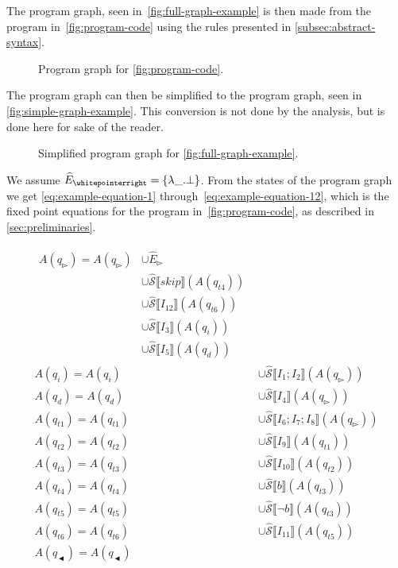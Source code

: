 The program graph, seen in~\autoref{fig:full-graph-example} is then made from the program in~\autoref{fig:program-code} using the rules presented in \autoref{subsec:abstract-syntax}.

\begin{figure}
    \centering
    
    \caption{Program graph for \autoref{fig:program-code}.}
    \label{fig:full-graph-example}
\end{figure}


The program graph can then be simplified to the program graph, seen in \autoref{fig:simple-graph-example}.
This conversion is not done by the analysis, but is done here for sake of the reader.

\begin{figure}
    \centering
    
    \caption{Simplified program graph for \autoref{fig:full-graph-example}.}
    \label{fig:simple-graph-example}
\end{figure}

We assume $\ab E_\whitepointerright=\{\lambda \_ .\bot\}$.
From the states of the program graph we get \autoref{eq:example-equation-1} through~\autoref{eq:example-equation-12}, which is the fixed point equations for the program in~\autoref{fig:program-code}, as described in \autoref{sec:preliminaries}.

\begin{align}
    \begin{split} \label{eq:example-equation-1}
        A(q_\whitepointerright)=A(q_\whitepointerright) &\cup \hat E_\whitepointerright \\&\cup \mathcal{\hat S} \lBrack skip \rBrack(A(q_{t4}))\\&\cup \mathcal{\hat S} \lBrack I_{12} \rBrack (A(q_{t6})) \\&\cup \mathcal{\hat S} \lBrack I_3 \rBrack (A(q_i)) \\&\cup \mathcal{\hat S} \lBrack I_5 \rBrack (A(q_d))
    \end{split}\\
    A(q_i)=A(q_i)&\cup \mathcal{\hat S} \lBrack I_1;I_2 \rBrack (A(q_\whitepointerright ))\\
    A(q_d)=A(q_d)&\cup \mathcal{\hat S} \lBrack I_4 \rBrack (A(q_\whitepointerright ))\\
    A(q_{t1})=A(q_{t1})&\cup \mathcal{\hat S} \lBrack I_6;I_7;I_8 \rBrack (A(q_\whitepointerright))\\
    A(q_{t2})=A(q_{t2})&\cup \mathcal{\hat S} \lBrack I_9 \rBrack (A(q_{t1}))\\
    A(q_{t3})=A(q_{t3})&\cup \mathcal{\hat S} \lBrack I_{10} \rBrack (A(q_{t2}))\\
    A(q_{t4})=A(q_{t4})&\cup \mathcal{\hat S} \lBrack b \rBrack (A(q_{t3}))\\
    A(q_{t5})=A(q_{t5})&\cup \mathcal{\hat S} \lBrack \neg b \rBrack (A(q_{t3}))\\
    A(q_{t6})=A(q_{t6})&\cup \mathcal{\hat S} \lBrack I_{11} \rBrack (A(q_{t5}))\\
    A(q_\blackpointerleft)=A(q_\blackpointerleft) \label{eq:example-equation-12}
\end{align}
    
